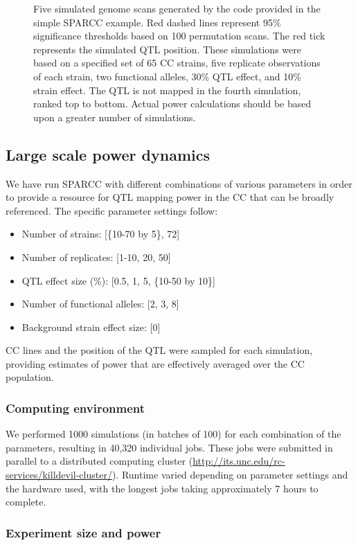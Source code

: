 \begin{figure}[h]
\caption[Simulated genome scans using SPARCC]{Five simulated genome scans generated by the code provided in the simple SPARCC example. Red dashed lines represent 95\% significance thresholds based on 100 permutation scans. The red tick represents the simulated QTL position. These simulations were based on a specified set of 65 CC strains, five replicate observations of each strain, two functional alleles, 30\% QTL effect, and 10\% strain effect. The QTL is not mapped in the fourth simulation, ranked top to bottom. Actual power calculations should be based upon a greater number of simulations.\label{fig:example_scans}}
\end{figure}

\subsection{Large scale power dynamics}

We have run SPARCC with different combinations of various parameters in order to provide a resource for QTL mapping power in the CC that can be broadly referenced. The specific parameter settings follow:
\begin{itemize}
	\item Number of strains: [\{10-70 by 5\}, 72] 
    \item Number of replicates: [1-10, 20, 50] 
    \item QTL effect size (\%): [0.5, 1, 5, \{10-50 by 10\}]
    \item Number of functional alleles: [2, 3, 8] 
    \item Background strain effect size: [0]
\end{itemize}
CC lines and the position of the QTL were sampled for each simulation, providing estimates of power that are effectively averaged over the CC population. 

\subsubsection{Computing environment}

We performed 1000 simulations (in batches of 100) for each combination of the parameters, resulting in 40,320 individual jobs. These jobs were submitted in parallel to a distributed computing cluster (\url{http://its.unc.edu/rc-services/killdevil-cluster/}). Runtime varied depending on parameter settings and the hardware used, with the longest jobs taking approximately 7 hours to complete.

\subsubsection{Experiment size and power}

